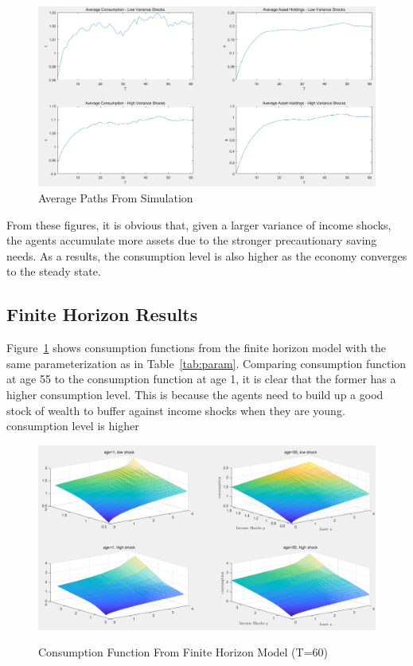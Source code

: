 \documentclass[thmsa,10pt]{article}
\begin{document}
\begin{figure}[h!]
\centering
\caption{Average Paths From Simulation}
\includegraphics[width=12cm]{./figs/simulation}
\end{figure}

From these figures, it is obvious that, given a larger variance of income shocks, the agents accumulate more assets due to the stronger precautionary saving needs. As a results, 
the consumption level is also higher as the economy converges to the steady state.  

\newpage
\subsection{Finite Horizon Results}
Figure~\ref{fig:consumptionT} shows consumption functions from the finite horizon model with the same parameterization as in Table~\ref{tab:param}. Comparing consumption function at age 55 to the consumption function at age 1, it is clear that the former has a higher consumption level. This is because the agents need to build up a good stock of wealth to buffer against income shocks when they are young.
consumption level is higher 
\begin{figure}[h!]
\centering
\caption{Consumption Function From Finite Horizon Model (T=60)}
\includegraphics[width=12cm]{./figs/consumptionT}
\label{fig:consumptionT}
\end{figure}
\end{document}
